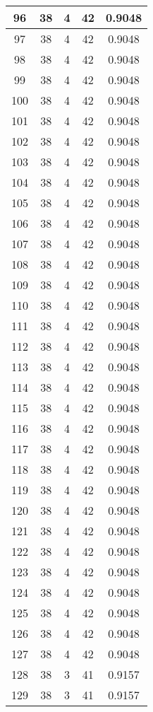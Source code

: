 \documentclass[letterpaper, 12pt]{article}
\begin{document}
\begin{longtable}{|c|c|c|c|c|}
\hline
96 & 38 & 4 & 42 & 0.9048 \\
\hline
97 & 38 & 4 & 42 & 0.9048 \\
\hline
98 & 38 & 4 & 42 & 0.9048 \\
\hline
99 & 38 & 4 & 42 & 0.9048 \\
\hline
100 & 38 & 4 & 42 & 0.9048 \\
\hline
101 & 38 & 4 & 42 & 0.9048 \\
\hline
102 & 38 & 4 & 42 & 0.9048 \\
\hline
103 & 38 & 4 & 42 & 0.9048 \\
\hline
104 & 38 & 4 & 42 & 0.9048 \\
\hline
105 & 38 & 4 & 42 & 0.9048 \\
\hline
106 & 38 & 4 & 42 & 0.9048 \\
\hline
107 & 38 & 4 & 42 & 0.9048 \\
\hline
108 & 38 & 4 & 42 & 0.9048 \\
\hline
109 & 38 & 4 & 42 & 0.9048 \\
\hline
110 & 38 & 4 & 42 & 0.9048 \\
\hline
111 & 38 & 4 & 42 & 0.9048 \\
\hline
112 & 38 & 4 & 42 & 0.9048 \\
\hline
113 & 38 & 4 & 42 & 0.9048 \\
\hline
114 & 38 & 4 & 42 & 0.9048 \\
\hline
115 & 38 & 4 & 42 & 0.9048 \\
\hline
116 & 38 & 4 & 42 & 0.9048 \\
\hline
117 & 38 & 4 & 42 & 0.9048 \\
\hline
118 & 38 & 4 & 42 & 0.9048 \\
\hline
119 & 38 & 4 & 42 & 0.9048 \\
\hline
120 & 38 & 4 & 42 & 0.9048 \\
\hline
121 & 38 & 4 & 42 & 0.9048 \\
\hline
122 & 38 & 4 & 42 & 0.9048 \\
\hline
123 & 38 & 4 & 42 & 0.9048 \\
\hline
124 & 38 & 4 & 42 & 0.9048 \\
\hline
125 & 38 & 4 & 42 & 0.9048 \\
\hline
126 & 38 & 4 & 42 & 0.9048 \\
\hline
127 & 38 & 4 & 42 & 0.9048 \\
\hline
128 & 38 & 3 & 41 & 0.9157 \\
\hline
129 & 38 & 3 & 41 & 0.9157 \\

\end{longtable}
\end{document}
